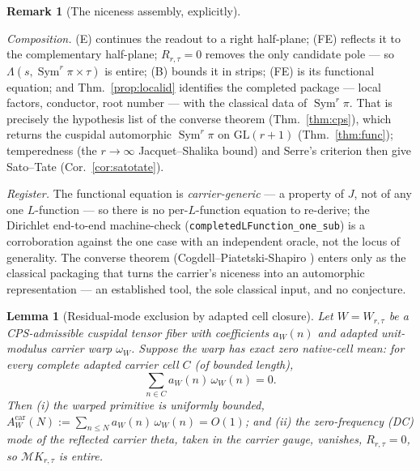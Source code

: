 \documentclass[11pt]{article}
\newtheorem{lemma}[theorem]{Lemma}
\theoremstyle{definition}
\newtheorem{remark}[theorem]{Remark}
\newcommand{\Sym}{\operatorname{Sym}}
\begin{document}
\begin{remark}[The niceness assembly, explicitly]
\begin{description}
\end{description}
\noindent\emph{Composition.} \textup{(E)} continues the readout to a right half-plane; \textup{(FE)}
reflects it to the complementary half-plane; $R_{r,\tau}=0$ removes the only candidate pole --- so
$\Lambda(s,\Sym^r\pi\times\tau)$ is entire; \textup{(B)} bounds it in strips; \textup{(FE)} is its
functional equation; and Thm.~\ref{prop:localid} identifies the completed package --- local factors,
conductor, root number --- with the classical data of $\Sym^r\pi$. That is precisely the hypothesis
list of the converse theorem (Thm.~\ref{thm:cps}), which returns the cuspidal automorphic $\Sym^r\pi$
on $\mathrm{GL}(r{+}1)$ (Thm.~\ref{thm:func}); temperedness (the $r\to\infty$ Jacquet--Shalika bound)
and Serre's criterion then give Sato--Tate (Cor.~\ref{cor:satotate}).

\noindent\emph{Register.} The functional equation is \emph{carrier-generic} --- a property of $J$, not
of any one $L$-function --- so there is no per-$L$-function equation to re-derive; the Dirichlet
end-to-end machine-check (\texttt{completedLFunction\_one\_sub}) is a corroboration against the one
case with an independent oracle, not the locus of generality. The converse theorem
(Cogdell--Piatetski-Shapiro \cite{CPS}) enters only as the classical packaging that turns the
carrier's niceness into an automorphic representation --- an established tool, the sole classical
input, and no conjecture.
\end{remark}

\begin{lemma}[Residual-mode exclusion by adapted cell closure]\label{lem:residual}
Let $W=W_{r,\tau}$ be a CPS-admissible cuspidal tensor fiber with coefficients $a_W(n)$ and adapted
unit-modulus carrier warp $\omega_W$. Suppose the warp has \emph{exact zero native-cell mean}: for every
complete adapted carrier cell $C$ (of bounded length),
\[
  \sum_{n\in C} a_W(n)\,\omega_W(n)=0 .
\]
Then \textup{(i)} the warped primitive is uniformly bounded,
$A^{\mathrm{car}}_W(N):=\sum_{n\le N} a_W(n)\,\omega_W(n)=O(1)$; and \textup{(ii)} the zero-frequency (DC)
mode of the reflected carrier theta, taken in the carrier gauge, vanishes, $R_{r,\tau}=0$, so
$\mathcal M K_{r,\tau}$ is entire.
\end{lemma}
\end{document}
